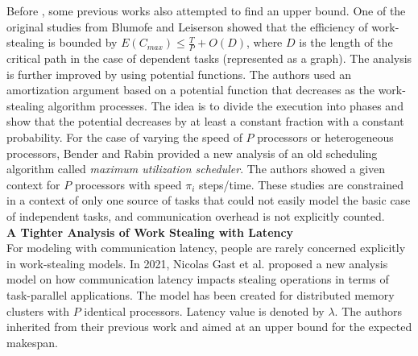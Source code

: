 Before \cite{tchiboukdjian2010tighter,tchiboukdjian2013decentralized}, some previous works also attempted to find an upper bound. One of the original studies from Blumofe and Leiserson \cite{Blumofe1999OriginWS} showed that the efficiency of work-stealing is bounded by $E(C_{max}) \leq \frac{T}{P} + O(D)$, where $D$ is the length of the critical path in the case of dependent tasks (represented as a graph). The analysis is further improved by \cite{arora2001thread} using potential functions. The authors used an amortization argument based on a potential function that decreases as the work-stealing algorithm processes. The idea is to divide the execution into phases and show that the potential decreases by at least a constant fraction with a constant probability. For the case of varying the speed of $P$ processors or heterogeneous processors, Bender and Rabin \cite{bender2002online} provided a new analysis of an old scheduling algorithm called \textit{maximum utilization scheduler}. The authors showed a given context for $P$ processors with speed $\pi_{i}$ steps/time. These studies are constrained in a context of only one source of tasks that could not easily model the basic case of independent tasks, and communication overhead is not explicitly counted.\\

\noindent \textbf{A Tighter Analysis of Work Stealing with Latency \cite{gast2021analysis}} \\

For modeling with communication latency, people are rarely concerned explicitly in work-stealing models. In 2021, Nicolas Gast et al. \cite{gast2021analysis} proposed a new analysis model on how communication latency impacts stealing operations in terms of task-parallel applications. The model has been created for distributed memory clusters with $P$ identical processors. Latency value is denoted by $\lambda$. The authors inherited from their previous work \cite{tchiboukdjian2013decentralized} and aimed at an upper bound for the expected makespan.\\

